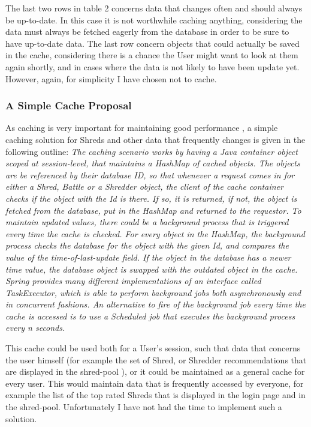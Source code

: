 The last two rows in table 2 concerns data that changes often and should always be up-to-date. In this case it is not worthwhile caching anything, considering the data must always be fetched eagerly from the database in order to be sure to have up-to-date data. The last row concern objects that could actually be saved in the cache, considering there is a chance the User might want to look at them again shortly, and in cases where the data is not likely to have been update yet. However, again, for simplicity I have chosen not to cache. 

\subsubsection{A Simple Cache Proposal}
As caching is very important for maintaining good performance , a simple caching solution for Shreds and other data that frequently changes is given in the following outline:
\textit{The caching scenario works by having a Java container object scoped at session-level, that maintains a HashMap of cached objects. The objects are be referenced by their database ID, so that whenever a request comes in for either a Shred, Battle or a Shredder object, the client of the cache container checks if the object with the Id is there. If so, it is returned, if not, the object is fetched from the database, put in the HashMap and returned to the requestor. To maintain updated values, there could be a background process that is triggered every time the cache is checked. For every object in the HashMap, the background process checks the database for the object with the given Id, and compares the value of the time-of-last-update field. If the object in the database has a newer time value, the database object is swapped with the outdated object in the cache. Spring provides many different implementations of an interface called TaskExecutor, which is able to perform background jobs both asynchronously and in concurrent fashions. An alternative to fire of the background job every time the cache is accessed is to use a Scheduled job that executes the background process every n seconds. } 

This cache could be used both for a User's session, such that data that concerns the user himself (for example the set of Shred, or Shredder recommendations that are displayed in the shred-pool ), or it could be maintained as a general cache for every user. This would maintain data that is frequently accessed by everyone, for example the list of the top rated Shreds that is displayed in the login page and in the shred-pool. Unfortunately I have not had the time to implement such a solution. 

